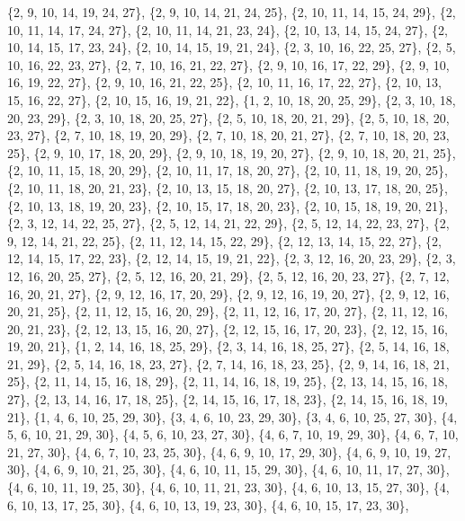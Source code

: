 \documentclass[11pt,a4paper]{article}
\begin{document}
{\{2, 9, 10, 14, 19, 24, 27\}, \{2, 9, 10, 14, 21, 24, 25\}, \{2, 10, 11, 14, 15, 24, 29\}, \{2, 10, 11, 14, 17, 24, 27\}, \{2, 10, 11, 14, 21, 23, 24\},
\{2, 10, 13, 14, 15, 24, 27\}, \{2, 10, 14, 15, 17, 23, 24\}, \{2, 10, 14, 15, 19, 21, 24\}, \{2, 3, 10, 16, 22, 25, 27\}, \{2, 5, 10, 16, 22, 23, 27\},
\{2, 7, 10, 16, 21, 22, 27\}, \{2, 9, 10, 16, 17, 22, 29\}, \{2, 9, 10, 16, 19, 22, 27\}, \{2, 9, 10, 16, 21, 22, 25\}, \{2, 10, 11, 16, 17, 22, 27\},
\{2, 10, 13, 15, 16, 22, 27\}, \{2, 10, 15, 16, 19, 21, 22\}, \{1, 2, 10, 18, 20, 25, 29\}, \{2, 3, 10, 18, 20, 23, 29\}, \{2, 3, 10, 18, 20, 25, 27\},
\{2, 5, 10, 18, 20, 21, 29\}, \{2, 5, 10, 18, 20, 23, 27\}, \{2, 7, 10, 18, 19, 20, 29\}, \{2, 7, 10, 18, 20, 21, 27\}, \{2, 7, 10, 18, 20, 23, 25\},
\{2, 9, 10, 17, 18, 20, 29\}, \{2, 9, 10, 18, 19, 20, 27\}, \{2, 9, 10, 18, 20, 21, 25\}, \{2, 10, 11, 15, 18, 20, 29\}, \{2, 10, 11, 17, 18, 20, 27\},
\{2, 10, 11, 18, 19, 20, 25\}, \{2, 10, 11, 18, 20, 21, 23\}, \{2, 10, 13, 15, 18, 20, 27\}, \{2, 10, 13, 17, 18, 20, 25\}, \{2, 10, 13, 18, 19, 20, 23\},
\{2, 10, 15, 17, 18, 20, 23\}, \{2, 10, 15, 18, 19, 20, 21\}, \{2, 3, 12, 14, 22, 25, 27\}, \{2, 5, 12, 14, 21, 22, 29\}, \{2, 5, 12, 14, 22, 23, 27\},
\{2, 9, 12, 14, 21, 22, 25\}, \{2, 11, 12, 14, 15, 22, 29\}, \{2, 12, 13, 14, 15, 22, 27\}, \{2, 12, 14, 15, 17, 22, 23\}, \{2, 12, 14, 15, 19, 21, 22\},
\{2, 3, 12, 16, 20, 23, 29\}, \{2, 3, 12, 16, 20, 25, 27\}, \{2, 5, 12, 16, 20, 21, 29\}, \{2, 5, 12, 16, 20, 23, 27\}, \{2, 7, 12, 16, 20, 21, 27\},
\{2, 9, 12, 16, 17, 20, 29\}, \{2, 9, 12, 16, 19, 20, 27\}, \{2, 9, 12, 16, 20, 21, 25\}, \{2, 11, 12, 15, 16, 20, 29\}, \{2, 11, 12, 16, 17, 20, 27\},
\{2, 11, 12, 16, 20, 21, 23\}, \{2, 12, 13, 15, 16, 20, 27\}, \{2, 12, 15, 16, 17, 20, 23\}, \{2, 12, 15, 16, 19, 20, 21\}, \{1, 2, 14, 16, 18, 25, 29\},
\{2, 3, 14, 16, 18, 25, 27\}, \{2, 5, 14, 16, 18, 21, 29\}, \{2, 5, 14, 16, 18, 23, 27\}, \{2, 7, 14, 16, 18, 23, 25\}, \{2, 9, 14, 16, 18, 21, 25\},
\{2, 11, 14, 15, 16, 18, 29\}, \{2, 11, 14, 16, 18, 19, 25\}, \{2, 13, 14, 15, 16, 18, 27\}, \{2, 13, 14, 16, 17, 18, 25\}, \{2, 14, 15, 16, 17, 18, 23\},
\{2, 14, 15, 16, 18, 19, 21\}, \{1, 4, 6, 10, 25, 29, 30\}, \{3, 4, 6, 10, 23, 29, 30\}, \{3, 4, 6, 10, 25, 27, 30\}, \{4, 5, 6, 10, 21, 29, 30\},
\{4, 5, 6, 10, 23, 27, 30\}, \{4, 6, 7, 10, 19, 29, 30\}, \{4, 6, 7, 10, 21, 27, 30\}, \{4, 6, 7, 10, 23, 25, 30\}, \{4, 6, 9, 10, 17, 29, 30\},
\{4, 6, 9, 10, 19, 27, 30\}, \{4, 6, 9, 10, 21, 25, 30\}, \{4, 6, 10, 11, 15, 29, 30\}, \{4, 6, 10, 11, 17, 27, 30\}, \{4, 6, 10, 11, 19, 25, 30\},
\{4, 6, 10, 11, 21, 23, 30\}, \{4, 6, 10, 13, 15, 27, 30\}, \{4, 6, 10, 13, 17, 25, 30\}, \{4, 6, 10, 13, 19, 23, 30\}, \{4, 6, 10, 15, 17, 23, 30\},
}
\end{document}
